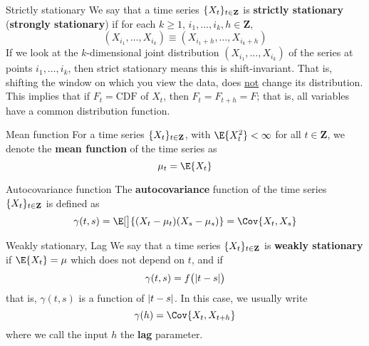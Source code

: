 \begin{Definition}{Strictly stationary}{}
    We say that a time series $ \{X_t\}_{t\in\mathbf{Z}} $
    is \textbf{strictly stationary} (\textbf{strongly stationary})
    if for each $ k\ge 1 $, $ i_1,\ldots,i_k,h\in\mathbf{Z} $,
    \[ (X_{i_1},\ldots,X_{i_k})\equiv
        (X_{i_{1}+h},\ldots,X_{i_k+h}) \]
    {\color{blue}If we look at the $ k $-dimensional joint distribution
    $ (X_{i_1},\ldots,X_{i_k}) $
    of the series at points $ i_1,\ldots,i_k $, then
    strict stationary means this is shift-invariant.}
    That is, shifting the window on which
    you view the data, does \underline{not} change its distribution.
    This implies that if $ F_t=\text{CDF} $ of $ X_t $, then
    $ F_t=F_{t+h}=F $; that is, all variables have a common distribution function.
\end{Definition}
\begin{Definition}{Mean function}{}
    For a time series $ \{X_t\}_{t\in\mathbf{Z}} $, with
    $ \E{X_t^2}<\infty $ for all $ t\in\mathbf{Z} $,
    we denote the \textbf{mean function} of the time series as
    \[ \mu_t=\E{X_t} \]
\end{Definition}
\begin{Definition}{Autocovariance function}{}
    The \textbf{autocovariance} function of the time series $ \{X_t\}_{t\in\mathbf{Z}} $
    is defined as
    \[ \gamma(t,s)=\E[\big]{(X_t-\mu_t)(X_s-\mu_s)}=\Cov{X_t,X_s} \]
\end{Definition}
\begin{Definition}{Weakly stationary, Lag}{}
    We say that a time series $ \{X_t\}_{t\in\mathbf{Z}} $
    is \textbf{weakly stationary} if $ \E{X_t}=\mu $
    which does not depend on $ t $, and if
    \[ \gamma(t,s)=f\bigl(\lvert t-s\rvert\bigr) \]
    that is, $ \gamma(t,s) $ is a function of $ \lvert t-s\rvert $. In this case,
    we usually write
    \[ \gamma(h)=\Cov{X_t,X_{t+h}} \]
    where we call the input $ h $ the \textbf{lag} parameter.
\end{Definition}

